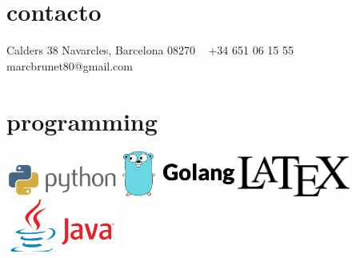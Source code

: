 \documentclass[]{cv-style}          %
\begin{document}
\lastupdated


\begin{aside}
%
\section{contacto}
Calders 38
Navarcles, Barcelona 08270
~
+34 651 06 15 55
~
marcbrunet80@gmail.com
%
%
\section{programming}
\includegraphics[width=10em]{programing/python.png}\smallskip
\includegraphics[width=10em]{programing/golang.png}\smallskip
\includegraphics[width=10em]{programing/Latex.png}\smallskip
\includegraphics[width=10em]{programing/java.png}
%

\end{aside}
\end{document}
